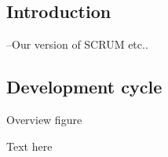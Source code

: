 \subsection{Introduction}
--Our version of SCRUM etc..

\subsection{Development cycle}
Overview figure

Text here
